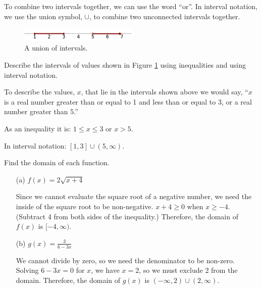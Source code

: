 To combine two intervals together, we can use the word ``or''. In interval notation, we use the
union symbol, $\cup$, to combine two unconnected intervals together.

\begin{figure}[ht!]
\centering
\includegraphics[width=0.5\textwidth]{img/chap1/sec1-2/ex-1-2-11.png}
\caption{A union of intervals.}
\label{fig:1211}
\end{figure}

\begin{example}
Describe the intervals of values shown in Figure \ref{fig:1211} using inequalities and using interval notation.

\begin{solution} To describe the values, $x$, that lie in the intervals shown above
we would say, ``$x$ is a real number greater than or equal to 1 and
less than or equal to 3, or a real number greater than 5.''

As an inequality it is: $1\le x\le 3$ or $x > 5$.

In interval notation: $[1, 3]\cup(5, \infty)$.
\end{solution}\end{example}

\begin{example}
Find the domain of each function.
\begin{itemize}
    \item[(a)] $f(x) = 2\sqrt{x+4}$

    \begin{solution} Since we cannot evaluate the square root of a negative number, we need the inside of the square root to be non-negative. $x+4 \ge 0$ when $x \ge -4$. (Subtract 4 from both sides of the inequality.) Therefore, the domain of $f(x)$ is $[-4, \infty)$.
        \end{solution}
    \item[(b)] $g(x) = \frac{3}{6-3x}$

    \begin{solution} We cannot divide by zero, so we need the denominator to be non-zero. Solving $6-3x = 0$ for $x$, we have $x = 2$, so we must exclude 2 from the domain. Therefore, the domain of $g(x)$ is $(-\infty, 2)\cup(2, \infty)$.
        \end{solution}
\end{itemize}

\end{example}


